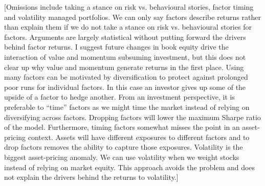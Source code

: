 [Omissions include taking a stance on risk vs. behavioural stories, factor
timing and volatility managed portfolios. We can only say factors describe
returns rather than explain them if we do not take a stance on risk vs.
behavioural stories for factors. Arguments are largely statistical without
putting forward the drivers behind factor returns. I suggest future changes in
book equity drive the interaction of value and momentum subsuming investment,
but this does not clear up why value and momentum generate returns in the first
place. Using many factors can be motivated by diversification to protect
against prolonged poor runs for individual factors. In this case an investor
gives up some of the upside of a factor to hedge another. From an investment
perspective, it is preferable to ``time” factors as we might time the market
instead of relying on diversifying across factors. Dropping factors will lower
the maximum Sharpe ratio of the model. Furthermore, timing factors somewhat
misses the point in an asset-pricing context. Assets will have different
exposures to different factors and to drop factors removes the ability to
capture those exposures. Volatility is the biggest asset-pricing anomaly. We
can use volatility when we weight stocks instead of relying on market equity.
This approach avoids the problem and does not explain the drivers behind the
returns to volatility.]
